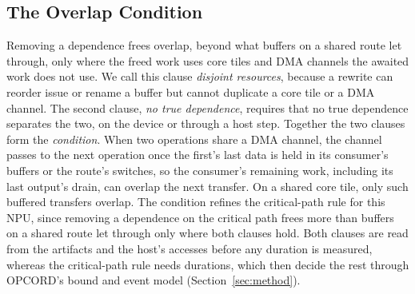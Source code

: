\subsection{The Overlap Condition}
\label{subsec:question}

Removing a dependence frees overlap, beyond what buffers on a shared route let through, only where the freed work uses core tiles and DMA channels the awaited work does not use.
We call this clause \emph{disjoint resources}, because a rewrite can reorder issue or rename a buffer but cannot duplicate a core tile or a DMA channel.
The second clause, \emph{no true dependence}, requires that no true dependence separates the two, on the device or through a host step.
Together the two clauses form the \emph{condition}.
When two operations share a DMA channel, the channel passes to the next operation once the first's last data is held in its consumer's buffers or the route's switches, so the consumer's remaining work, including its last output's drain, can overlap the next transfer.
On a shared core tile, only such buffered transfers overlap.
The condition refines the critical-path rule for this NPU, since removing a dependence on the critical path frees more than buffers on a shared route let through only where both clauses hold.
Both clauses are read from the artifacts and the host's accesses before any duration is measured, whereas the critical-path rule needs durations, which then decide the rest through OPCORD's bound and event model (Section~\ref{sec:method}).

